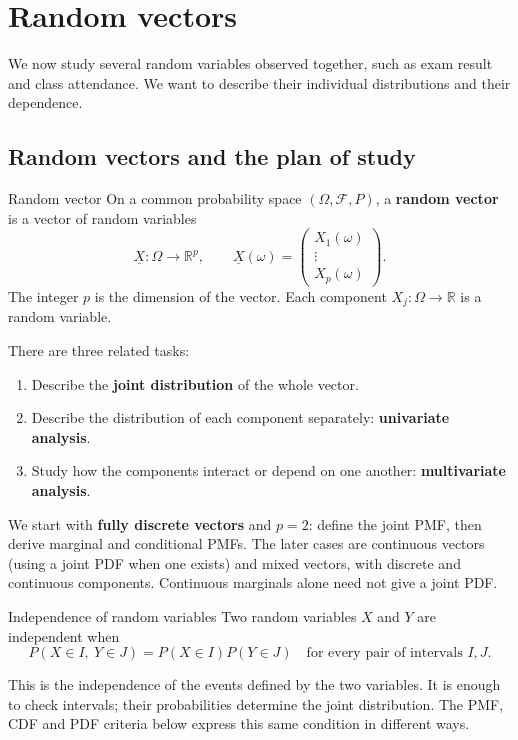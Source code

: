 \documentclass[a4paper,12pt,oneside]{report}
\begin{document}
\chapter{Random vectors}
\label{chap:random-vectors}


We now study several random variables observed together, such as
exam result and class attendance. We want to describe their
individual distributions and their dependence.

\section{Random vectors and the plan of study}

\begin{frameddefn}{Random vector}
On a common probability space $(\Omega,\mathcal F,P)$, a
\textbf{random vector} is a vector of random variables
\[
  \underline{X}:\Omega\longrightarrow\mathbb R^p,
  \qquad
  \underline{X}(\omega)=
  \begin{pmatrix}
    X_1(\omega)\\
    \vdots\\
    X_p(\omega)
  \end{pmatrix}.
\]
The integer $p$ is the dimension of the vector. Each component
$X_j:\Omega\to\mathbb R$ is a random variable.
\end{frameddefn}

There are three related tasks:
\begin{enumerate}
  \item Describe the \textbf{joint distribution} of the whole vector.
  \item Describe the distribution of each component separately:
    \textbf{univariate analysis}.
  \item Study how the components interact or depend on one another:
    \textbf{multivariate analysis}.
\end{enumerate}

We start with \textbf{fully discrete vectors} and $p=2$: define
the joint PMF, then derive marginal and conditional PMFs.
The later cases are continuous vectors (using a joint PDF when
one exists) and mixed vectors, with discrete and continuous
components. Continuous marginals alone need not give a joint PDF.

\begin{frameddefn}{Independence of random variables}
\label{def:independent-random-variables}
Two random variables $X$ and $Y$ are independent when
\[
  P(X\in I,\ Y\in J)=P(X\in I)P(Y\in J)
  \quad\text{for every pair of intervals }I,J.
\]
\end{frameddefn}
This is the independence of the events defined by the two
variables. It is enough to check intervals; their probabilities
determine the joint distribution. The PMF, CDF and PDF criteria
below express this same condition in different ways.
\end{document}
